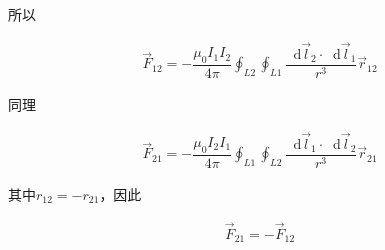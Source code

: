 \documentclass{article}
\newcommand*{\md}{\mathop{}\!\mathrm{d}}
\begin{document}
所以

\begin{equation*}
  \begin{aligned}
    \vec{F}_{12} = - \dfrac{\mu_0 I_1 I_2}{4 \pi} \oint_{L2} \oint_{L1} \dfrac{\md \vec{l}_2 \cdot \md \vec{l}_1}{r^3} \vec{r}_{12}
  \end{aligned}
\end{equation*}

同理

\begin{equation*}
  \begin{aligned}
    \vec{F}_{21} = - \dfrac{\mu_0 I_2 I_1}{4 \pi} \oint_{L1} \oint_{L2} \dfrac{\md \vec{l}_1 \cdot \md \vec{l}_2}{r^3} \vec{r}_{21}
  \end{aligned}
\end{equation*}

其中$r_{12} = - r_{21}$，因此

\begin{equation*}
  \begin{aligned}
    \vec{F}_{21} = - \vec{F}_{12}
  \end{aligned}
\end{equation*}
\end{document}

